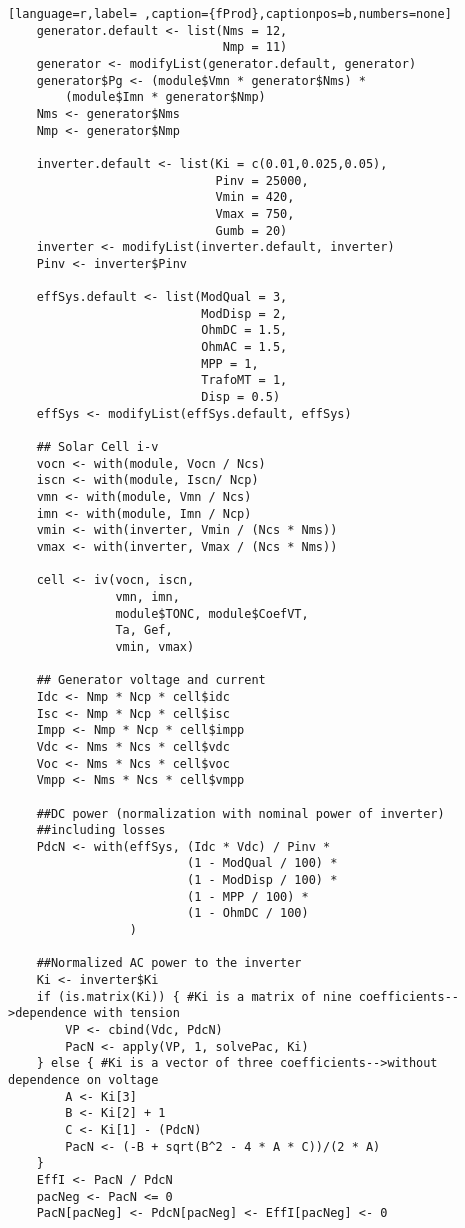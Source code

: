 \begin{lstlisting}[language=r,label= ,caption={fProd},captionpos=b,numbers=none]
    generator.default <- list(Nms = 12,
                              Nmp = 11)
    generator <- modifyList(generator.default, generator)
    generator$Pg <- (module$Vmn * generator$Nms) *
        (module$Imn * generator$Nmp)
    Nms <- generator$Nms
    Nmp <- generator$Nmp

    inverter.default <- list(Ki = c(0.01,0.025,0.05),
                             Pinv = 25000,
                             Vmin = 420,
                             Vmax = 750,
                             Gumb = 20)
    inverter <- modifyList(inverter.default, inverter)
    Pinv <- inverter$Pinv

    effSys.default <- list(ModQual = 3,
                           ModDisp = 2,
                           OhmDC = 1.5,
                           OhmAC = 1.5,
                           MPP = 1,
                           TrafoMT = 1,
                           Disp = 0.5)
    effSys <- modifyList(effSys.default, effSys)

    ## Solar Cell i-v
    vocn <- with(module, Vocn / Ncs)
    iscn <- with(module, Iscn/ Ncp)
    vmn <- with(module, Vmn / Ncs)
    imn <- with(module, Imn / Ncp)
    vmin <- with(inverter, Vmin / (Ncs * Nms))
    vmax <- with(inverter, Vmax / (Ncs * Nms))

    cell <- iv(vocn, iscn,
               vmn, imn,
               module$TONC, module$CoefVT,
               Ta, Gef,
               vmin, vmax)

    ## Generator voltage and current
    Idc <- Nmp * Ncp * cell$idc
    Isc <- Nmp * Ncp * cell$isc
    Impp <- Nmp * Ncp * cell$impp
    Vdc <- Nms * Ncs * cell$vdc
    Voc <- Nms * Ncs * cell$voc
    Vmpp <- Nms * Ncs * cell$vmpp

    ##DC power (normalization with nominal power of inverter)
    ##including losses
    PdcN <- with(effSys, (Idc * Vdc) / Pinv *
                         (1 - ModQual / 100) *
                         (1 - ModDisp / 100) *
                         (1 - MPP / 100) *
                         (1 - OhmDC / 100)
                 ) 

    ##Normalized AC power to the inverter
    Ki <- inverter$Ki
    if (is.matrix(Ki)) { #Ki is a matrix of nine coefficients-->dependence with tension
        VP <- cbind(Vdc, PdcN)
        PacN <- apply(VP, 1, solvePac, Ki)
    } else { #Ki is a vector of three coefficients-->without dependence on voltage
        A <- Ki[3]
        B <- Ki[2] + 1
        C <- Ki[1] - (PdcN)
        PacN <- (-B + sqrt(B^2 - 4 * A * C))/(2 * A)
    }
    EffI <- PacN / PdcN
    pacNeg <- PacN <= 0
    PacN[pacNeg] <- PdcN[pacNeg] <- EffI[pacNeg] <- 0



\end{lstlisting}

